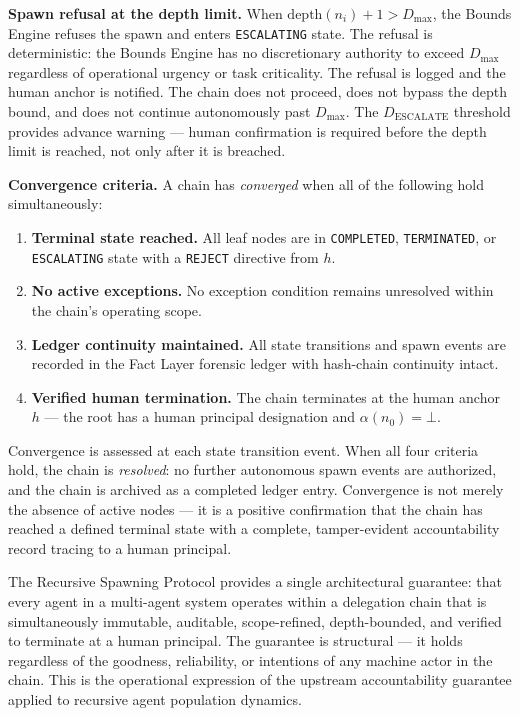 \medskip
\noindent\textbf{Spawn refusal at the depth limit.} When $\text{depth}(n_i) + 1 > D_{\max}$, the Bounds Engine refuses the spawn and enters \texttt{ESCALATING} state. The refusal is deterministic: the Bounds Engine has no discretionary authority to exceed $D_{\max}$ regardless of operational urgency or task criticality. The refusal is logged and the human anchor is notified. The chain does not proceed, does not bypass the depth bound, and does not continue autonomously past $D_{\max}$. The $D_{\text{ESCALATE}}$ threshold provides advance warning — human confirmation is required before the depth limit is reached, not only after it is breached.

\medskip
\noindent\textbf{Convergence criteria.} A chain has \emph{converged} when all of the following hold simultaneously:

\begin{enumerate}
    \item[(C1)] \textbf{Terminal state reached.} All leaf nodes are in \texttt{COMPLETED}, \texttt{TERMINATED}, or \texttt{ESCALATING} state with a \texttt{REJECT} directive from $h$.
    \item[(C2)] \textbf{No active exceptions.} No exception condition remains unresolved within the chain's operating scope.
    \item[(C3)] \textbf{Ledger continuity maintained.} All state transitions and spawn events are recorded in the Fact Layer forensic ledger with hash-chain continuity intact.
    \item[(C4)] \textbf{Verified human termination.} The chain terminates at the human anchor $h$ — the root has a human principal designation and $\alpha(n_0) = \bot$.
\end{enumerate}

Convergence is assessed at each state transition event. When all four criteria hold, the chain is \emph{resolved}: no further autonomous spawn events are authorized, and the chain is archived as a completed ledger entry. Convergence is not merely the absence of active nodes — it is a positive confirmation that the chain has reached a defined terminal state with a complete, tamper-evident accountability record tracing to a human principal.

\medskip

The Recursive Spawning Protocol provides a single architectural guarantee: that every agent in a multi-agent system operates within a delegation chain that is simultaneously immutable, auditable, scope-refined, depth-bounded, and verified to terminate at a human principal. The guarantee is structural — it holds regardless of the goodness, reliability, or intentions of any machine actor in the chain. This is the operational expression of the upstream \bxthree{} accountability guarantee applied to recursive agent population dynamics.